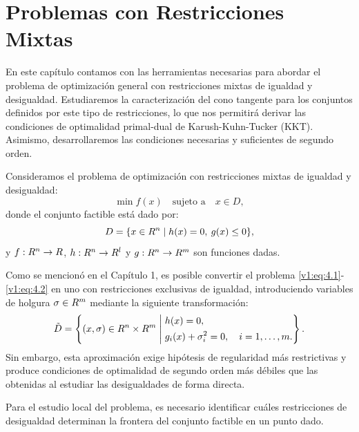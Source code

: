 
\chapter{Problemas con Restricciones Mixtas}
\label{v1:chap:4}

En este capítulo contamos con las herramientas necesarias para abordar el problema de optimización general con restricciones mixtas de igualdad y desigualdad. Estudiaremos la caracterización del cono tangente para los conjuntos definidos por este tipo de restricciones, lo que nos permitirá derivar las condiciones de optimalidad primal-dual de Karush-Kuhn-Tucker (KKT). Asimismo, desarrollaremos las condiciones necesarias y suficientes de segundo orden.

Consideramos el problema de optimización con restricciones mixtas de igualdad y desigualdad:
\begin{equation}
 \min f(x) \quad \text{sujeto a} \quad x \in D,
 \label{v1:eq:4.1}
\end{equation}
donde el conjunto factible está dado por:
\begin{equation}
 D = \{ x \in R^n \mid h(x) = 0, \: g(x) \le 0 \},
 \label{v1:eq:4.2}
\end{equation}
y $f : R^n \to R$, $h : R^n \to R^l$ y $g : R^n \to R^m$ son funciones dadas.

\begin{notabox}
 Como se mencionó en el Capítulo 1, es posible convertir el problema \eqref{v1:eq:4.1}-\eqref{v1:eq:4.2} en uno con restricciones exclusivas de igualdad, introduciendo variables de holgura $\sigma \in R^m$ mediante la siguiente transformación:
 \[
 \tilde{D} = \left\{ (x, \sigma) \in R^n \times R^m \mathrel{\Bigg|} \begin{aligned} &h(x) = 0, \\ &g_i(x) + \sigma_i^2 = 0, \quad i = 1, \dots, m. \end{aligned} \right\}.
 \]
 Sin embargo, esta aproximación exige hipótesis de regularidad más restrictivas y produce condiciones de optimalidad de segundo orden más débiles que las obtenidas al estudiar las desigualdades de forma directa.
\end{notabox}

Para el estudio local del problema, es necesario identificar cuáles restricciones de desigualdad determinan la frontera del conjunto factible en un punto dado.

